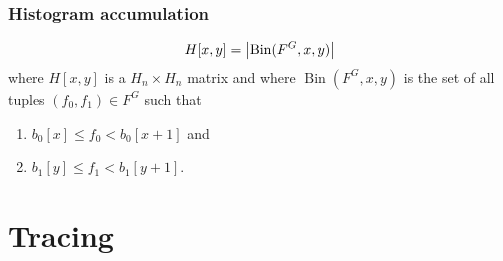 \documentclass[12pt]{article}
\begin{document}
\subsubsection{Histogram accumulation}

\begin{dmath*}
	H[x,y] =  \Dim{ \operatorname{Bin}(F^G, x, y) }
\end{dmath*}
where \(H[x,y]\) is a \(H_n \times H_n\) matrix and
where \(\operatorname{Bin}(F^G, x, y)\) is the set of all tuples
\((f_0, f_1) \in F^G\) such that
\begin{enumerate}
	\item \(b_0[x] \le f_0 < b_0[x+1]\) and
	\item \(b_1[y] \le f_1 < b_1[y+1]\).
\end{enumerate}



\section{Tracing}
\end{document}
